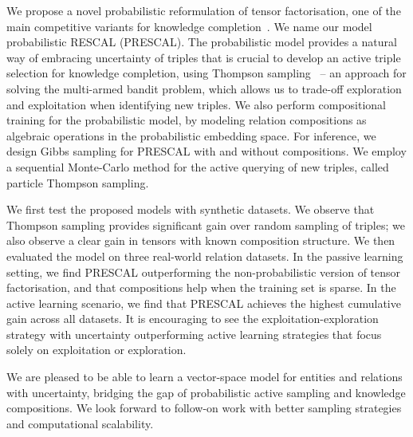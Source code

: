 {%
We propose a novel probabilistic reformulation of tensor factorisation,  
one of the main competitive variants for knowledge completion~\cite{nickel2015review}. 
We name our model probabilistic RESCAL (PRESCAL).
The probabilistic model provides a natural way of 
embracing uncertainty of triples that is crucial to develop 
an active triple selection for knowledge completion, using  
Thompson sampling~\cite{scott10bandit} -- an approach for solving the multi-armed bandit problem,
which allows us to trade-off exploration and exploitation when identifying new triples.
We also perform compositional training for the probabilistic model, 
by modeling relation compositions as algebraic operations in the probabilistic embedding space. 
For inference, we design Gibbs sampling for PRESCAL with and without compositions. 
We employ a sequential Monte-Carlo method for the active querying of new triples, 
called particle Thompson sampling. 

We first test the proposed models with synthetic datasets. 
We observe that Thompson sampling provides significant gain over random sampling of triples; 
we also observe a clear gain in tensors with known composition structure. 
We then evaluated the model on three real-world relation datasets. In the passive learning setting, 
we find PRESCAL outperforming the non-probabilistic version of tensor factorisation, 
and that compositions help when the training set is sparse. 
In the active learning scenario, 
we find that PRESCAL achieves the highest cumulative gain across all datasets. 
It is encouraging to see the exploitation-exploration strategy with uncertainty outperforming 
active learning strategies that focus solely on exploitation or exploration. 

We are pleased to be able to learn a vector-space model for entities and relations with uncertainty, 
bridging the gap of probabilistic active sampling and knowledge compositions. 
We look forward to follow-on work with better sampling strategies and computational scalability. 
}

